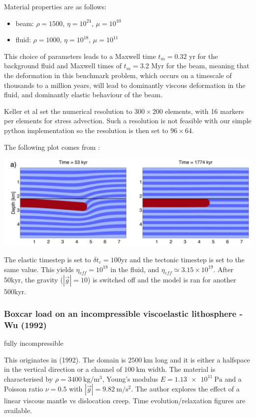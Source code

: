 Material properties are as follows:
\begin{itemize}
\item beam: $\rho=1500$, $\eta=10^{24}$, $\mu=10^{10}$
\item fluid: $\rho=1000$, $\eta=10^{18}$, $\mu=10^{11}$
\end{itemize}

This choice of parameters leads to a Maxwell time 
$t_m = 0.32$ yr for the background fluid and Maxwell times of  
$t_m = 3.2$ Myr for the beam, meaning that the deformation in this benchmark problem, 
which occurs on a timescale of thousands to a million years, 
will lead to dominantly viscous deformation in the fluid, 
and dominantly elastic behaviour of the beam. 

Keller et al set the numerical resolution to $300\times200$ elements, 
with 16 markers per elements for stress advection. Such a resolution is  
not feasible with our simple python implementation so the resolution is
then set to $96\times64$. 

The following plot comes from \cite{kemk13}:
\begin{center}
\includegraphics[width=14cm]{images/viscoelasticity/kemk13}
\end{center}

The elastic timestep is set to $\delta t_e=100$yr and the tectonic timestep is set to the same value.
This yields $\eta_{eff}=10^{18}$ in the fluid, and $\eta_{eff}\simeq 3.15\times 10^{19}$.
After 50kyr, the gravity ($|\vec{g}|=10$) is switched off and the model is ran for another 
500kyr.


\subsubsection{Boxcar load on an incompressible viscoelastic lithosphere - Wu (1992)}

{\color{orange} fully incompressible}

This originates in \textcite{wu92} (1992).
The domain is $2500~\si{\km}$ long and it is either 
a halfspace in the vertical direction 
or a channel of $100~\si{\km}$ width. 
The material is characterised by 
$\rho=3400~\si{\kg\per\cubic\meter}$, 
Young's modulus $E=\SI{1.13e11}{\pascal}$ 
and a Poisson ratio $\nu=0.5$ with $|\vec{g}|=9.82~\si{\meter\per\square\second}$.
The author explores the effect of a linear viscous mantle vs dislocation creep.
Time evolution/relaxation figures are available.


